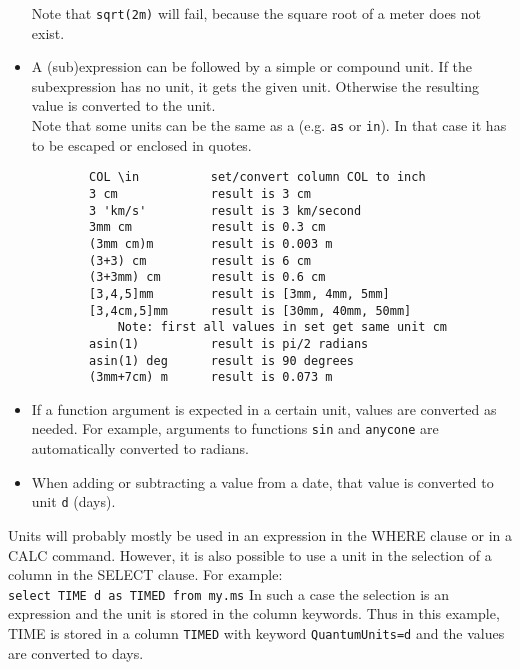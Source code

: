 \begin{itemize}
	Note that \texttt{sqrt(2m)} will fail, because the square root
	of a meter does not exist.
 \item A (sub)expression can be followed by a simple or compound unit.
       If the subexpression has no unit, it gets the given unit.
       Otherwise the resulting value is converted to the unit.
       \\Note that some units can be the same as a
       (e.g. \texttt{as} or \texttt{in}).
       In that case it has to be escaped or enclosed in quotes.
	\begin{verbatim}
        COL \in          set/convert column COL to inch
        3 cm             result is 3 cm
        3 'km/s'         result is 3 km/second
        3mm cm           result is 0.3 cm
        (3mm cm)m        result is 0.003 m
        (3+3) cm         result is 6 cm
        (3+3mm) cm       result is 0.6 cm
        [3,4,5]mm        result is [3mm, 4mm, 5mm]
        [3,4cm,5]mm      result is [30mm, 40mm, 50mm]
            Note: first all values in set get same unit cm
        asin(1)          result is pi/2 radians
        asin(1) deg      result is 90 degrees
        (3mm+7cm) m      result is 0.073 m
	\end{verbatim}
 \item If a function argument is expected in a certain unit, values
	are converted as needed. For example, arguments to functions 
	\texttt{sin} and \texttt{anycone}
	are automatically converted to radians.
 \item When adding or subtracting a value from a date, that value is
	converted to unit \texttt{d} (days).
\end{itemize}
Units will probably mostly be used in an expression in the WHERE
clause or in a CALC command. However, it is also possible to use a
unit in the selection of a column in the SELECT clause. For example:
\\\texttt{select TIME d as TIMED from my.ms}
In such a case the selection is an expression and the unit is stored
in the column keywords. Thus in this example, TIME is stored in a
column \texttt{TIMED} with keyword \texttt{QuantumUnits=d} and the 
values are converted to days.

